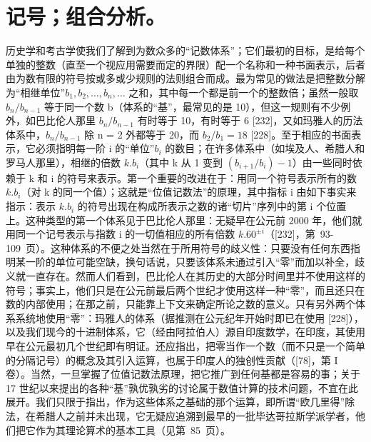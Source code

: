 \chapter{记号；组合分析。}

历史学和考古学使我们了解到为数众多的“记数体系”；它们最初的目标，是给每个单独的整数（直至一个视应用需要而定的界限）配一个名称和一种书面表示，后者由为数有限的符号按或多或少规则的法则组合而成。最为常见的做法是把整数分解为“相继单位”\(b_{1}, b_{2}, \ldots, b_{n}, \ldots\) 之和，其中每一个都是前一个的整数倍；虽然一般取 \(b_{n}/b_{n-1}\) 等于同一个数 b（体系的“基”，最常见的是 10），但这一规则有不少例外，如巴比伦人那里 \(b_{n}/b_{n-1}\) 有时等于 10，有时等于 6 {[}232{]}，又如玛雅人的历法体系中，\(b_{n}/b_{n-1}\) 除 n = 2 外都等于 20，而 \(b_{2}/b_{1} = 18\) {[}228{]}。至于相应的书面表示，它必须指明每一阶 i 的“单位”\(b_{i}\) 的数目；在许多体系中（如埃及人、希腊人和罗马人那里），相继的倍数 \(k.b_{i}\)（其中 k 从 1 变到 \((b_{i+1}/b_{i}) - 1\)）由一些同时依赖于 k 和 i 的符号来表示。第一个重要的改进在于：用同一个符号表示所有的数 \(k.b_{i}\)（对 k 的同一个值）；这就是“位值记数法”的原理，其中指标 i 由如下事实来指示：表示 \(k.b_{i}\) 的符号出现在构成所表示之数的诸“切片”序列中的第 i 个位置上。这种类型的第一个体系见于巴比伦人那里：无疑早在公元前 2000 年，他们就用同一个记号表示与指数 i 的一切值相应的所有倍数 \(k.60^{\pm i}\)（{[}232{]}，第~93-109~页）。这种体系的不便之处当然在于所用符号的歧义性：只要没有任何东西指明某一阶的单位可能空缺，换句话说，只要该体系未通过引入“零”而加以补全，歧义就一直存在。然而人们看到，巴比伦人在其历史的大部分时间里并不使用这样的符号；事实上，他们只是在公元前最后两个世纪才使用这样一种“零”，而且还只在数的内部使用；在那之前，只能靠上下文来确定所论之数的意义。只有另外两个体系系统地使用“零”：玛雅人的体系（据推测在公元纪年开始时即已在使用 {[}228{]}），以及我们现今的十进制体系，它（经由阿拉伯人）源自印度数学，在印度，其使用早在公元最初几个世纪即有明证。还应指出，把零当作一个数（而不只是一个简单的分隔记号）的概念及其引入运算，也属于印度人的独创性贡献（{[}78{]}，第 I 卷）。当然，一旦掌握了位值记数法原理，把它推广到任何基都是容易的事；关于 17 世纪以来提出的各种“基”孰优孰劣的讨论属于数值计算的技术问题，不宜在此展开。我们只限于指出，作为这些体系之基础的那个运算，即所谓“欧几里得”除法，在希腊人之前并未出现，它无疑应追溯到最早的一批毕达哥拉斯学派学者，他们把它作为其理论算术的基本工具（见第~85~页）。

